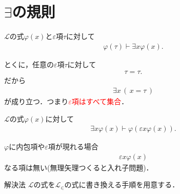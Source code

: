\section{$\exists$の規則}
	\begin{screen}
		\begin{logicalaxm}
			$\mathcal{L}$の式$\varphi(x)$と$\varepsilon$項$\tau$に対して
			\begin{align}
				\varphi(\tau) \vdash \exists x \varphi(x).
			\end{align}
		\end{logicalaxm}
	\end{screen}
	
	とくに，任意の$\varepsilon$項$\tau$に対して
	\begin{align}
		\tau = \tau.
	\end{align}
	だから
	\begin{align}
		\exists x\, (\, x = \tau\, )
	\end{align}
	が成り立つ．つまり\textcolor{red}{$\varepsilon$項はすべて集合}．
	
\newpage
	\begin{screen}
		\begin{logicalaxm}
			$\mathcal{L}$の式$\varphi(x)$に対して
			\begin{align}
				\exists x \varphi(x) \vdash \varphi(\varepsilon x \varphi(x)).
			\end{align}
		\end{logicalaxm}
	\end{screen}
	
	$\varphi$に内包項や$\varepsilon$項が現れる場合
	\begin{align}
		\varepsilon x \varphi(x)
	\end{align}
	なる項は無い(無理矢理つくると入れ子問題)．
	
	
	\begin{itembox}[l]{解決法}
		$\mathcal{L}$の式を$\mathcal{L}_{\in}$の式に書き換える手順を用意する．
	\end{itembox}